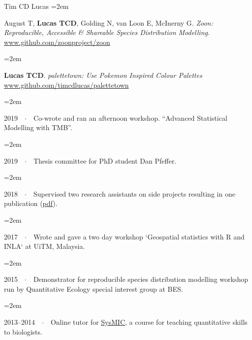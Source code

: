 \documentclass{scrartcl}
\newcommand{\Description}[1]{\hangindent=2em\hangafter=0\noindent\raggedright\footnotesize{#1}\par\normalsize\vspace{1em}} %
\begin{document}
\begin{cv}{Tim {\Large CD} Lucas}
\Description{August T, \textbf{Lucas TCD}, Golding N, van Loon E, McInerny G. \emph{Zoon: Reproducible, Accessible \& Shareable Species Distribution Modelling}. \url{www.github.com/zoonproject/zoon}}

\Description{\textbf{Lucas TCD}. \emph{palettetown: Use Pokemon Inspired Colour Palettes} \url{www.github.com/timcdlucas/palettetown}}


\vspace{1em} %

{\color{Maroon}}\vspace{1em}

\Description{2019\ \ $\cdotp$\ \ Co-wrote and ran an afternoon workshop. ``Advanced Statistical Modelling with TMB''.}
\vspace{-0.5em} %

\Description{2019\ \ $\cdotp$\ \ Thesis committee for PhD student Dan Pfeffer.}
\vspace{-0.5em} %

\Description{2018\ \ $\cdotp$\ \ Supervised two research assistants on side projects resulting in one publication (\href{https://malariajournal.biomedcentral.com/track/pdf/10.1186/s12936-018-2500-5}{pdf}).}
\vspace{-0.5em} %

\Description{2017\ \ $\cdotp$\ \ Wrote and gave a two day workshop `Geospatial statistics with R and INLA` at UiTM, Malaysia.}
\vspace{-0.5em} %


\Description{2015\ \ $\cdotp$\ \ Demonstrator for reproducible species distribution modelling workshop run by Quantitative Ecology special interest group at BES.}
\vspace{-0.5em} %

\Description{2013--2014\ \ $\cdotp$\ \ Online tutor for \href{http://sysmic.ac.uk/home.html}{{\footnotesize SysMIC}}, a course for teaching quantitative skills to biologists.}

\vspace{1em} %



\end{cv}
\end{document}
